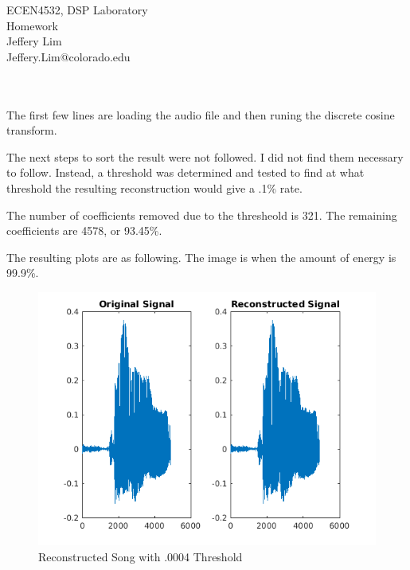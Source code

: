 \documentclass[11pt, a4paper]{article}
\begin{document}
\begin{center}
  \Huge ECEN4532, DSP Laboratory \\
  \huge Homework \\
  
  \vspace{7in}
    \huge Jeffery Lim \\
    \huge Jeffery.Lim@colorado.edu\\~\\~\\
\end{center}
\pagebreak

The first few lines are loading the audio file and then runing the discrete cosine transform.



The next steps to sort the result were not followed. I did not find them necessary to follow. Instead, a threshold was determined and tested to find at what threshold the resulting reconstruction would give a .1\% rate. 




The number of coefficients removed due to the thresheold is 321. The remaining coefficients are 4578, or 93.45\%.

The resulting plots are as following. The image is when the amount of energy is 99.9\%. 

 


\begin{figure}[H]
\hspace*{-2cm}    
    \centering
    \includegraphics[width=\textwidth]{ReconstructedImage99.png}
    \caption{Reconstructed Song with .0004 Threshold}
\end{figure}
\end{document}
